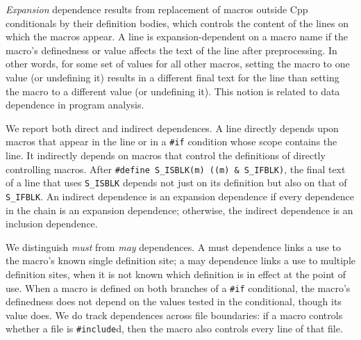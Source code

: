 \documentclass[10pt]{article}
\begin{document}
\emph{Expansion} dependence results from replacement of macros outside Cpp
conditionals by their definition bodies, which controls the content of the
lines on which the macros appear.  A line is expansion-dependent on a macro
name if the macro's definedness or value affects the text of the line after
preprocessing.  In other words, for some set of values for all other
macros, setting the macro to one value (or undefining it) results in a
different final text for the line than setting the macro to a different
value (or undefining it).  This notion is related to data dependence in
program analysis.

We report both direct and indirect dependences.  A line directly depends
upon macros that appear in the line or in a {\tt \#if} condition whose
scope contains the line.  It indirectly depends on macros that control the
definitions of directly controlling macros.  After {\tt \#define
\verb|S_ISBLK|(m) ((m)~\&~\verb|S_IFBLK|)}, the final text of a line that
uses \verb|S_ISBLK| depends not just on its definition but also on that of
\verb|S_IFBLK|.  An indirect dependence is an expansion dependence if every
dependence in the chain is an expansion dependence; otherwise, the indirect
dependence is an inclusion dependence.

We distinguish \emph{must} from \emph{may} dependences.  A must dependence
links a use to the macro's known single definition site; a may dependence
links a use to multiple definition sites, when it is not known which
definition is in effect at the point of use.  When a macro is defined on
both branches of a {\tt \#if} conditional, the macro's definedness does not
depend on the values tested in the conditional, though its value does.  We
do track dependences across file boundaries: if a macro controls whether a
file is {\tt \#include}d, then the macro also controls every line of that
file.

\end{document}
